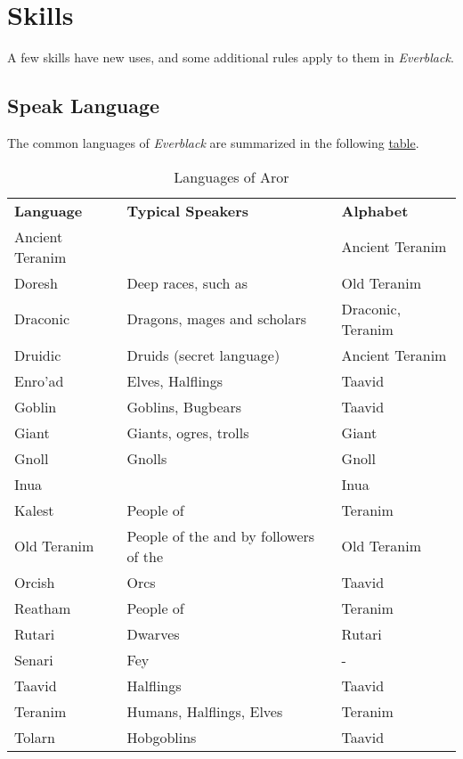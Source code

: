 \section{Skills}
\label{sec:Skills}

A few skills have new uses, and some additional rules apply to them in
\emph{Everblack}.

\subsection{Speak Language}
\label{sec:Speak Language}

The common languages of \emph{Everblack} are summarized in the following
\hyperref[tbl:Languages]{table}.

\begin{table*}[!htb]
  \caption{Languages of Aror} \label{tbl:Languages}
  \begin{tabular}{l p{8cm} l}
    \textbf{Language} & \textbf{Typical Speakers} & \textbf{Alphabet} \\
    Ancient Teranim & \nameref{sec:Tynrikke}      & Ancient Teranim \\
    Doresh          & Deep races, such as \nameref{sec:Deepkin} & Old Teranim \\
    Draconic        & Dragons, mages and scholars & Draconic, Teranim \\
    Druidic         & Druids (secret language)    & Ancient Teranim \\
    Enro'ad         & Elves, Halflings            & Taavid \\
    Goblin          & Goblins, Bugbears           & Taavid \\
    Giant           & Giants, ogres, trolls       & Giant \\
    Gnoll           & Gnolls                      & Gnoll \\
    Inua            & \nameref{sec:Inua}          & Inua \\
    Kalest          & People of \nameref{sec:Arania} & Teranim \\
    Old Teranim     & People of the \nameref{sec:Dirgewood} and by followers of the \nameref{sec:Old Ways} & Old Teranim \\
    Orcish          & Orcs                        & Taavid \\
    Reatham         & People of \nameref{sec:Forsby} & Teranim \\
    Rutari          & Dwarves                     & Rutari \\
    Senari          & Fey                         & - \\
    Taavid          & Halflings                   & Taavid \\
    Teranim         & Humans, Halflings, Elves    & Teranim \\
    Tolarn          & Hobgoblins                  & Taavid \\
  \end{tabular}
\end{table*}

